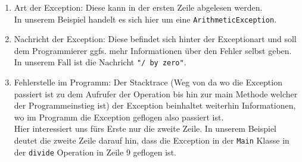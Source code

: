 \begin{Infobox}[Exception]
    \begin{enumerate}[label=\roman*)]
        \item Art der Exception: Diese kann in der ersten Zeile abgelesen werden.\\
            In unserem Beispiel handelt es sich hier um eine \lstinline{ArithmeticException}.
        \item Nachricht der Exception: Diese befindet sich hinter der Exceptionart und soll dem Programmierer ggfs. mehr Informationen über den Fehler selbst geben.\\
            In unserem Fall ist die Nachricht \lstinline{"/ by zero"}.
        \item Fehlerstelle im Programm: Der Stacktrace (Weg von da wo die Exception passiert ist zu dem Aufrufer der Operation bis hin zur main Methode welcher der Programmeinstieg ist) der Exception beinhaltet weiterhin Informationen, wo im Programm die Exception geflogen also passiert ist.\\
            Hier interessiert uns fürs Erste nur die zweite Zeile. In unserem Beispiel deutet die zweite Zeile darauf hin, dass die Exception in der \lstinline{Main} Klasse in der \lstinline{divide}
        Operation in Zeile 9 geflogen ist.
    \end{enumerate}

\end{Infobox}


